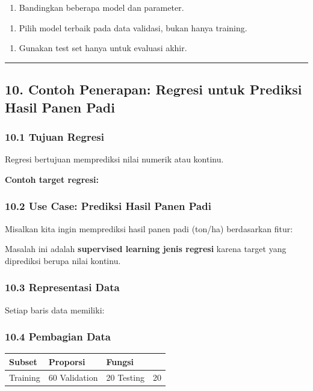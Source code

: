 \documentclass[12pt,a4paper]{article}
\begin{document}
\begin{enumerate}
\item Bandingkan beberapa model dan parameter.
\end{enumerate}

\begin{enumerate}
\item Pilih model terbaik pada data validasi, bukan hanya training.
\end{enumerate}

\begin{enumerate}
\item Gunakan test set hanya untuk evaluasi akhir.
\end{enumerate}


\hrule


\subsection{10. Contoh Penerapan: Regresi untuk Prediksi Hasil Panen Padi}

\subsubsection{10.1 Tujuan Regresi}

Regresi bertujuan memprediksi nilai numerik atau kontinu.


\textbf{Contoh target regresi:}


\subsubsection{10.2 Use Case: Prediksi Hasil Panen Padi}

Misalkan kita ingin memprediksi hasil panen padi (ton/ha) berdasarkan fitur:


Masalah ini adalah \textbf{supervised learning jenis regresi} karena target yang diprediksi berupa nilai kontinu.


\subsubsection{10.3 Representasi Data}

Setiap baris data memiliki:


\subsubsection{10.4 Pembagian Data}

\begin{tabular}{|l|l|l|}
\hline
Subset & Proporsi & Fungsi \\
\hline
Training & 60%
\hline
Validation & 20%
\hline
Testing & 20%
\hline
\end{tabular}
\end{document}
